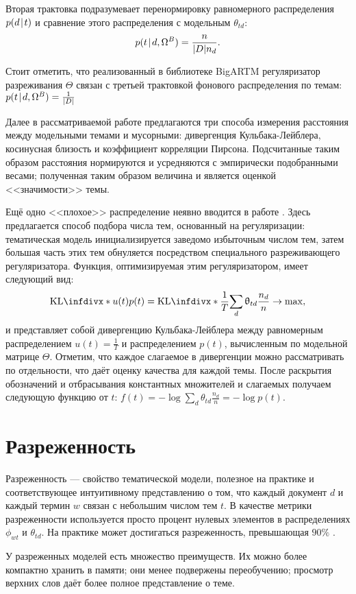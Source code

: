 Вторая трактовка подразумевает перенормировку равномерного распределения $p(d\mspace{2mu}{|}\mspace{2mu} t)$ и сравнение этого распределения с модельным $\theta_{td}$:
$$
    p(t\mspace{2mu}{|}\mspace{2mu} d, \Omega^B) = \frac{n}{|D| n_d}.
$$

Стоит отметить, что реализованный в библиотеке BigARTM регуляризатор разреживания $\Theta$ связан с третьей трактовкой фонового распределения по темам: $p(t\mspace{2mu}{|}\mspace{2mu} d, \Omega^B) = \frac{1}{|D|} $

Далее в рассматриваемой работе предлагаются три способа измерения расстояния между модельными темами и мусорными: дивергенция Кульбака-Лейблера, косинусная близость и коэффициент корреляции Пирсона. Подсчитанные таким образом расстояния нормируются и усредняются с эмпирически подобранными весами; полученная таким образом величина и является оценкой <<значимости>> темы.

Ещё одно <<плохое>> распределение неявно вводится в работе \cite{voron15plavin}. Здесь предлагается способ подбора числа тем, основанный на регуляризации: тематическая модель инициализируется заведомо избыточным числом тем, затем большая часть этих тем обнуляется посредством специального разреживающего регуляризатора. Функция, оптимизируемая этим регуляризатором, имеет следующий вид:
\[
    \textup{KL}\infdiv*{u(t)}{p(t)} = \textup{KL}\infdiv*{\frac{1}{T}}{\sum_d \theta_{td} \frac{n_d}{n}} \rightarrow \max,
\]
и представляет собой дивергенцию Кульбака-Лейблера между равномерным распределением $u(t) = \frac{1}{T}$ и распределением $p(t)$, вычисленным по модельной матрице $\Theta$. Отметим, что каждое слагаемое в дивергенции можно рассматривать по отдельности, что даёт оценку качества для каждой темы. После раскрытия обозначений и отбрасывания константных множителей и слагаемых получаем следующую функцию от $t$:
$f(t) = - \log \sum_d \theta_{td} \frac{n_d}{n} = -\log p(t)$.

\section{Разреженность}

Разреженность --- свойство тематической модели, полезное на практике и соответствующее интуитивному представлению о том, что каждый документ $d$ и каждый термин $w$ связан с небольшим числом тем $t$. В качестве метрики разреженности используется просто процент нулевых элементов в распределениях $\phi_{wt}$ и $\theta_{td}$. На практике может достигаться разреженность, превышающая $90\%$ \cite{potapenko2013robust}.

У разреженных моделей есть множество преимуществ. Их можно более компактно хранить в памяти; они менее подвержены переобучению; просмотр верхних слов даёт более полное представление о теме.

